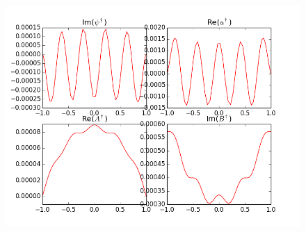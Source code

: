 \documentclass[letterpaper,12pt]{article}
\begin{document}
\begin{figure}[h!]
\centering
\includegraphics[scale=0.5]{nonadjoint_redonly}
\end{figure}




\end{document}
